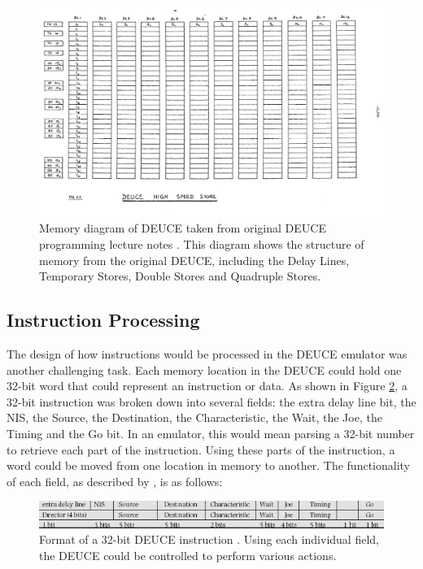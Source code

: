 \documentclass{l4proj}
\begin{document}
\begin{figure}[t]
	\includegraphics[width=\textwidth]{images/memory-real}
	\caption{Memory diagram of DEUCE taken from original DEUCE programming lecture notes \citep{tnmoc18}. This diagram shows the structure of memory from the original DEUCE, including the Delay Lines, Temporary Stores, Double Stores and Quadruple Stores.}
	\label{fig:memory-real}
\end{figure}

\subsection{Instruction Processing}
The design of how instructions would be processed in the DEUCE emulator was another challenging task. Each memory location in the DEUCE could hold one 32-bit word that could represent an instruction or data. As shown in Figure \ref{fig:instr-format}, a 32-bit instruction was broken down into several fields: the extra delay line bit, the NIS, the Source, the Destination, the Characteristic, the Wait, the Joe, the Timing and the Go bit. In an emulator, this would mean parsing a 32-bit number to retrieve each part of the instruction. Using these parts of the instruction, a word could be moved from one location in memory to another. The functionality of each field, as described by \citet{Vowels05}, is as follows:

\begin{figure}[h]
	\centering
	\includegraphics[width=\linewidth]{images/instr-format}
	\caption{Format of a 32-bit DEUCE instruction \citep{Vowels05}. Using each individual field, the DEUCE could be controlled to perform various actions.}
	\label{fig:instr-format}
\end{figure}
\end{document}
